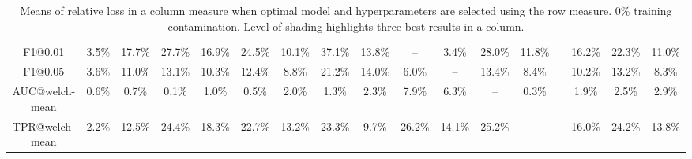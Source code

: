 \begin{table*}
{\begin{tabular}[h]{c c c c c c c c c c c c c c c c c }
  F1@0.01 & 3.5\% & 17.7\% & 27.7\% & 16.9\% & 24.5\% & 10.1\% & 37.1\% & 13.8\% & -- & \cellcolor{gray!45}3.4\% & 28.0\% & 11.8\% &  & 16.2\% & 22.3\% & 11.0\%  \\ 
  F1@0.05 & 3.6\% & 11.0\% & 13.1\% & 10.3\% & 12.4\% & 8.8\% & 21.2\% & 14.0\% & \cellcolor{gray!45}6.0\% & -- & 13.4\% & 8.4\% &  & 10.2\% & 13.2\% & 8.3\%  \\ 
  AUC@welch-mean & 0.6\% & 0.7\% & \cellcolor{gray!45}0.1\% & \cellcolor{gray!30}1.0\% & \cellcolor{gray!30}0.5\% & 2.0\% & \cellcolor{gray!45}1.3\% & 2.3\% & \cellcolor{gray!15}7.9\% & 6.3\% & -- & \cellcolor{gray!30}0.3\% &  & \cellcolor{gray!30}1.9\% & \cellcolor{gray!30}2.5\% & 2.9\%  \\ 
  TPR@welch-mean & 2.2\% & 12.5\% & 24.4\% & 18.3\% & 22.7\% & 13.2\% & 23.3\% & 9.7\% & 26.2\% & 14.1\% & 25.2\% & -- &  & 16.0\% & 24.2\% & 13.8\%  \\ 
 \end{tabular}
 }
 \caption{Means of relative loss in a column measure when optimal model and hyperparameters are selected using the row measure. 0\%  training contamination. Level of shading highlights three best results in a column.} 
 \label{tab:measure_comparison_full_0_by_models_welch_mean} 
\end{table*}